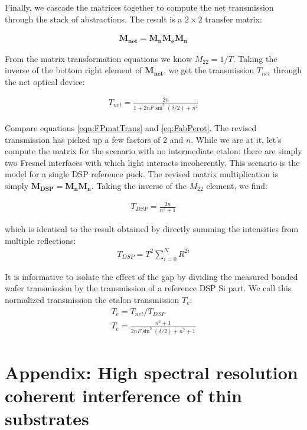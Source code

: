 \documentclass[osajnl,preprint,showpacs,superscriptaddress,12pt]{revtex4-1} %
\begin{document}
Finally, we cascade the matrices together to compute the net transmission through the stack of abstractions.  The result is a $2\times2$ transfer matrix: 

\begin{eqnarray}
\boldsymbol{M_{net}}=\boldsymbol{M_n}\boldsymbol{M_e}\boldsymbol{M_n}
\end{eqnarray}

From the matrix transformation equations \cite{2007fuph.book.....S} we know $M_{22}=1/T$.  Taking the inverse of the bottom right element of $\boldsymbol{M_{net}}$, we get the transmission $T_{net}$ through the net optical device: 

\begin{eqnarray}
T_{net}=\frac{2 n}{1+ 2n F\sin ^2(\delta/2)+n^2} \label{eqn:FPmatTrans}
\end{eqnarray}

Compare equations \ref{eqn:FPmatTrans} and \ref{eq:FabPerot}.  The revised transmission has picked up a few factors of 2 and $n$.  While we are at it, let's compute the matrix for the scenario with no intermediate etalon: there are simply two Fresnel interfaces with which light interacts incoherently.  This scenario is the model for a single DSP reference puck. The revised matrix multiplication is simply $\boldsymbol{M_{DSP}}=\boldsymbol{M_n}\boldsymbol{M_n}$.  Taking the inverse of the $M_{22}$ element, we find: 

\begin{eqnarray}
T_{DSP}=\frac{2 n}{n^2+1}\label{eqn:EqofSummedSlab}
\end{eqnarray}

which is identical to the result obtained by directly summing the intensities from multiple reflections:
\begin{eqnarray}
T_{DSP}=T^2 \sum_{i=0}^{N}R^{2i} \label{eqn:multsum}
\end{eqnarray}

It is informative to isolate the effect of the gap by dividing the measured bonded wafer transmission by the transmission of a reference DSP Si part.  We call this normalized transmission the etalon transmission $T_{e}$:
\begin{eqnarray}
T_{e} = T_{net}/T_{DSP} \\
T_{e} = \frac{n^2+1}{2 n F \sin ^2(\delta/2)+n^2+1} \label{eqn:Tetalon}
\end{eqnarray}

\section{Appendix: High spectral resolution coherent interference of thin substrates}
\end{document}
